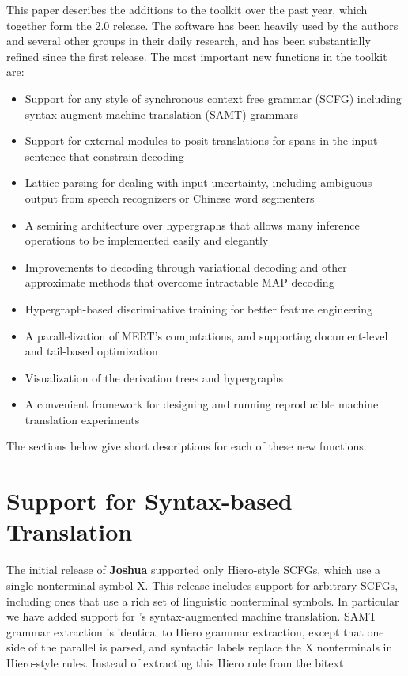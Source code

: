 \documentclass[11pt]{article}
\newcommand{\joshua}{\textbf{Joshua}\xspace}
\begin{document}
This paper describes the additions to the toolkit over the past year, which
together form the 2.0 release. The software has been heavily used by the
authors and several other groups in their daily research, and has been
substantially refined since the first release.  The most important new
functions in the toolkit are:
\begin{itemize}
\item
Support for any style of synchronous context free grammar (SCFG)
including syntax augment machine translation (SAMT) grammars \cite{samt2006}
\item
Support for external modules to posit translations for spans in the input sentence that constrain decoding   \cite{PBML-2010-Joshua-modules}
\item
Lattice parsing for dealing with input uncertainty, including ambiguous output from speech recognizers or Chinese word segmenters  \cite{dyer-muresan-resnik:2008:ACLMain}
\item
A semiring architecture over hypergraphs that allows many inference operations to be implemented easily and elegantly \cite{li-eisner:2009:EMNLP}
\item
Improvements to decoding through variational decoding and other approximate methods that overcome intractable MAP decoding \cite{variational-decoding-acl09}
\item
Hypergraph-based discriminative training for better feature engineering \cite{zhifei-forest-reranking-galebook}
\item
A parallelization of MERT's computations, and supporting document-level and tail-based optimization \cite{atypical-mert}
\item
Visualization of the derivation trees and hypergraphs \cite{PBML-2010-Joshua-visualization}
\item
A convenient framework for designing and running reproducible machine translation experiments \cite{Schwartz-wmt10-pipline}
\end{itemize}
The sections below give short descriptions for each of these new functions.


\section{Support for Syntax-based Translation}

The initial release of \joshua supported only Hiero-style SCFGs, which use a single nonterminal symbol X.  This release includes support for arbitrary SCFGs, including ones that use a rich set of linguistic nonterminal symbols.  
In particular we have added support for 's syntax-augmented machine
translation. SAMT grammar extraction is identical to Hiero grammar extraction, except that one side of the parallel is parsed, and syntactic labels replace the X
nonterminals in Hiero-style rules.  Instead of extracting this Hiero rule from the bitext
\end{document}
